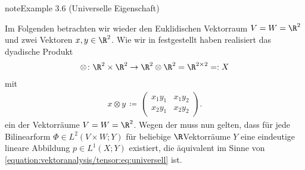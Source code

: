\documentclass[letterpaper,10pt,german]{jupyterBook}
\begin{document}
\begin{sphinxadmonition}{note}{Example 3.6 (Universelle Eigenschaft)}



\sphinxAtStartPar
Im Folgenden betrachten wir wieder den Euklidischen Vektorraum \(V=W=\R^2\) und zwei Vektoren \(x, y \in \R^2\).
Wie wir in {\hyperref[\detokenize{vektoranalysis/tensor:ex:tensorproduktVarianten}]{}} festgestellt haben realisiert das dyadische Produkt
\begin{equation*}
\begin{split}\otimes \colon \R^2 \times \R^2 \rightarrow \R^2 \otimes \R^2 = \R^{2 \times 2} =: X\end{split}
\end{equation*}
\sphinxAtStartPar
mit
\begin{equation*}
\begin{split}x \otimes y \, \coloneqq \,
\begin{pmatrix}
x_1y_1 & x_1y_2 \\
x_2y_1 & x_2y_2
\end{pmatrix}.\end{split}
\end{equation*}
\sphinxAtStartPar
ein  der Vektorräume \(V=W=\R^2\).
Wegen der  muss nun gelten, dass für jede Bilinearform \(\Phi \in L^2(V \times W; Y)\) für beliebige \(\R\)\sphinxhyphen{}Vektorräume \(Y\) eine eindeutige lineare Abbildung \(p \in L^1(X; Y)\) existiert, die äquivalent im Sinne von \eqref{equation:vektoranalysis/tensor:eq:universell} ist.


\end{sphinxadmonition}
\end{document}
